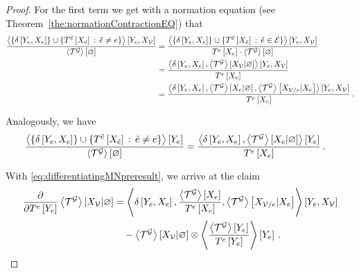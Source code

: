 \begin{proof}
	For the first term we get with a normation equation (see Theorem~\ref{the:normationContractionEQ}) that
	\begin{align*}
		\frac{ \left\langle \{\delta\left[Y_{e},X_{e}\right]\}\cup\{T^{\tilde{e}}\left[X_{\tilde{e}}\right] \, : \, \tilde{e}\neq e \}\right\rangle \left[ Y_{e},X_{\mathcal{V}} \right]}{\left\langle \mathcal{T}^{\mathcal{G}}\right\rangle \left[ \varnothing \right]} 	
		&= \frac{\left\langle \{\delta\left[Y_{e},X_{e}\right]\}\cup\{T^{\tilde{e}}\left[X_{\tilde{e}}\right] \, : \, \tilde{e}\in\mathcal{E} \}\right\rangle \left[ Y_{e},X_{\mathcal{V}} \right]}{T^{e}\left[X_{e}\right]  \cdot \left\langle \mathcal{T}^{\mathcal{G}}\right\rangle \left[ \varnothing \right]} \\
		&= \frac{
		\left\langle \delta\left[Y_{e},X_{e}\right],\left\langle \mathcal{T}^{\mathcal{G}}\right\rangle \left[ X_{\mathcal{V}} | \varnothing \right]\right\rangle \left[ Y_{e},X_{\mathcal{V}} \right]
		}{T^{e}\left[X_{e}\right]}  \\ 
		&= \frac{\left\langle \delta\left[Y_{e},X_{e}\right],
			\left\langle \mathcal{T}^{\mathcal{G}}\right\rangle \left[ X_{e} | \varnothing \right],
			\left\langle \mathcal{T}^{\mathcal{G}}\right\rangle \left[ X_{\mathcal{V}/e} | X_{e} \right]
			\right\rangle \left[ Y_{e},X_{\mathcal{V}} \right]
		}{T^{e}\left[X_{e}\right]}  \, . 
	\end{align*}
	
	Analogously, we have 
	\begin{align*}
		\frac{ \contractionof{\{\identityat{\seccatvariableof{\edge},\edgevariables}\}\cup\{\hypercoreofat{\secedge}{\catvariableof{\secedge}} \, : \, \secedge\neq\edge \}}{\seccatvariableof{\edge}}}{\contraction{\extnet}} 	
		&= \frac{\sbcontractionof{\identityat{\seccatvariableof{\edge},\edgevariables},
			\normationof{\extnet}{\edgevariables}%
			}{\seccatvariableof{\edge}}
		}{\hypercoreofat{\edge}{\edgevariables}}  \, . 
	\end{align*}
		
	With \eqref{eq:differentiatingMNpreresult}, we arrive at the claim 
	\begin{align*}
		\frac{\partial }{\partial T^{e}\left[Y_{e}\right]} \left\langle \mathcal{T}^{\mathcal{G}}\right\rangle \left[ X_{\mathcal{V}} | \varnothing \right]
		& = \left\langle 
	 	\delta\left[Y_{e},X_{e}\right], 
		\frac{\left\langle \mathcal{T}^{\mathcal{G}}\right\rangle \left[ X_{e} \right]}{T^{e}\left[X_{e}\right]}, 
		\left\langle \mathcal{T}^{\mathcal{G}}\right\rangle \left[ X_{\mathcal{V}/e} | X_{e} \right] \right\rangle \left[ Y_{e},X_{\mathcal{V}} \right] \\
		& \quad -  \left\langle \mathcal{T}^{\mathcal{G}}\right\rangle \left[ X_{\mathcal{V}} | \varnothing \right] \otimes \left\langle \frac{\left\langle \mathcal{T}^{\mathcal{G}}\right\rangle \left[ Y_{e} \right]}{T^{e}\left[Y_{e}\right]}
		\right\rangle \left[ Y_{e} \right] \, .
	\end{align*}
	
\end{proof}


